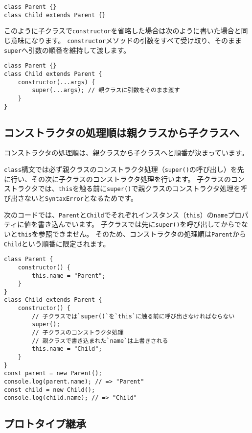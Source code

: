 \begin{lstlisting}
class Parent {}
class Child extends Parent {}
\end{lstlisting}

このように子クラスで\texttt{constructor}を省略した場合は次のように書いた場合と同じ意味になります。
\texttt{constructor}メソッドの引数をすべて受け取り、そのまま\texttt{super}へ引数の順番を維持して渡します。

\begin{lstlisting}
class Parent {}
class Child extends Parent {
    constructor(...args) {
        super(...args); // 親クラスに引数をそのまま渡す
    }
}
\end{lstlisting}

\hypertarget{constructor-order}{%
\subsection{コンストラクタの処理順は親クラスから子クラスへ}\label{constructor-order}}

コンストラクタの処理順は、親クラスから子クラスへと順番が決まっています。

\texttt{class}構文では必ず親クラスのコンストラクタ処理（\texttt{super()}の呼び出し）を先に行い、その次に子クラスのコンストラクタ処理を行います。
子クラスのコンストラクタでは、\texttt{this}を触る前に\texttt{super()}で親クラスのコンストラクタ処理を呼び出さないと\texttt{SyntaxError}となるためです。

次のコードでは、\texttt{Parent}と\texttt{Child}でそれぞれインスタンス（\texttt{this}）の\texttt{name}プロパティに値を書き込んでいます。
子クラスでは先に\texttt{super()}を呼び出してからでないと\texttt{this}を参照できません。
そのため、コンストラクタの処理順は\texttt{Parent}から\texttt{Child}という順番に限定されます。

\begin{lstlisting}
class Parent {
    constructor() {
        this.name = "Parent";
    }
}
class Child extends Parent {
    constructor() {
        // 子クラスでは`super()`を`this`に触る前に呼び出さなければならない
        super();
        // 子クラスのコンストラクタ処理
        // 親クラスで書き込まれた`name`は上書きされる
        this.name = "Child";
    }
}
const parent = new Parent();
console.log(parent.name); // => "Parent"
const child = new Child();
console.log(child.name); // => "Child"
\end{lstlisting}

\hypertarget{prototype-inheritance}{%
\subsection{プロトタイプ継承}\label{prototype-inheritance}}


